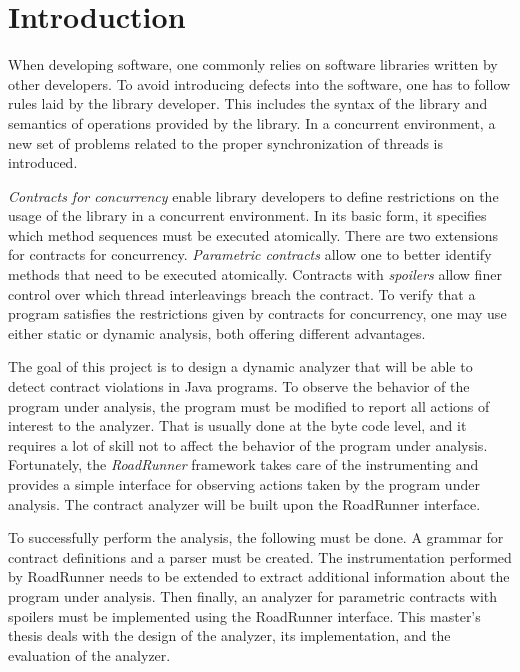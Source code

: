 
\chapter{Introduction}

When developing software, one commonly relies on software libraries written by
other developers. To avoid introducing defects into the software, one has to
follow rules laid by the library developer. This includes the syntax of the
library and semantics of operations provided by the library. In a concurrent
environment, a new set of problems related to the proper synchronization of
threads is introduced.

\emph{Contracts for concurrency} enable library developers to define
restrictions on the usage of the library in a concurrent environment. In its
basic form, it specifies which method sequences must be executed atomically.
There are two extensions for contracts for concurrency. \emph{Parametric
contracts} allow one to better identify methods that need to be executed
atomically.  Contracts with \emph{spoilers} allow finer control over which
thread interleavings breach the contract. To verify that a program satisfies the
restrictions given by contracts for concurrency, one may use either static or
dynamic analysis, both offering different advantages.

The goal of this project is to design a dynamic analyzer that will be able to
detect contract violations in Java programs. To observe the behavior of the
program under analysis, the program must be modified to report all actions of
interest to the analyzer. That is usually done at the byte code level, and it
requires a lot of skill not to affect the behavior of the program under
analysis. Fortunately, the \emph{RoadRunner} framework takes care of the
instrumenting and provides a simple interface for observing actions taken by the
program under analysis. The contract analyzer will be built upon the RoadRunner
interface.

To successfully perform the analysis, the following must be done. A grammar for
contract definitions and a parser must be created. The instrumentation performed
by RoadRunner needs to be extended to extract additional information about the
program under analysis. Then finally, an analyzer for parametric contracts with
spoilers must be implemented using the RoadRunner interface. This master's
thesis deals with the design of the analyzer, its implementation, and the
evaluation of the analyzer.


